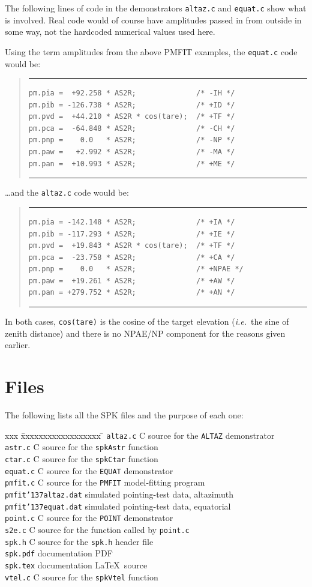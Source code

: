 \documentclass[11pt,fleqn,twoside,\paper]{article}
\renewcommand{\_}{{\tt\char'137}}     %
\newcommand{\scode}     {\goodbreak
                         \begin{quote}
                         \vspace{-6ex}
                         \rule[-2ex]{36em}{0.03ex}}
\newcommand{\ecode}     {\rule[2ex]{36em}{0.03ex}
                         \end{quote}
                         \vspace{-4ex}
                         \goodbreak}
\begin{document}
The following lines of code in
the demonstrators {\tt altaz.c} and {\tt equat.c}
show what is involved.  Real code would of course have
amplitudes passed in from outside in some way, not the
hardcoded numerical values used here.

Using the term amplitudes from the above PMFIT examples,
the {\tt equat.c} code would be:
\scode\begin{verbatim}
pm.pia =  +92.258 * AS2R;              /* -IH */
pm.pib = -126.738 * AS2R;              /* +ID */
pm.pvd =  +44.210 * AS2R * cos(tare);  /* +TF */
pm.pca =  -64.848 * AS2R;              /* -CH */
pm.pnp =    0.0   * AS2R;              /* -NP */
pm.paw =   +2.992 * AS2R;              /* -MA */
pm.pan =  +10.993 * AS2R;              /* +ME */
\end{verbatim}\ecode
\ldots and the {\tt altaz.c} code would be:
\scode\begin{verbatim}
pm.pia = -142.148 * AS2R;              /* +IA */
pm.pib = -117.293 * AS2R;              /* +IE */
pm.pvd =  +19.843 * AS2R * cos(tare);  /* +TF */
pm.pca =  -23.758 * AS2R;              /* +CA */
pm.pnp =    0.0   * AS2R;              /* +NPAE */
pm.paw =  +19.261 * AS2R;              /* +AW */
pm.pan = +279.752 * AS2R;              /* +AN */
\end{verbatim}\ecode
In both cases, {\tt cos(tare)} is the cosine of the
target elevation ({\it i.e.}~the sine of zenith distance)
and there is no NPAE/NP component for the reasons given
earlier.

\newpage

\section{Files}
\label{files}
The following lists all the SPK files and the purpose of each one:
\begin{tabbing}
xxx \= xxxxxxxxxxxxxxxxxx \= \kill
\> {\tt altaz.c} \> C source for the {\tt ALTAZ} demonstrator \\
\> {\tt astr.c} \> C source for the {\tt spkAstr} function \\
\> {\tt ctar.c} \> C source for the {\tt spkCtar} function \\
\> {\tt equat.c} \> C source for the {\tt EQUAT} demonstrator \\
\> {\tt pmfit.c} \> C source for the {\tt PMFIT} model-fitting program \\
\> {\tt pmfit\_altaz.dat} \> simulated pointing-test data, altazimuth \\
\> {\tt pmfit\_equat.dat} \> simulated pointing-test data, equatorial \\
\> {\tt point.c} \> C source for the {\tt POINT} demonstrator \\
\> {\tt s2e.c} \> C source for the function called by {\tt point.c} \\
\> {\tt spk.h} \> C source for the {\tt spk.h} header file \\
\> {\tt spk.pdf} \> documentation PDF \\
\> {\tt spk.tex} \> documentation \LaTeX\ source \\
\> {\tt vtel.c} \> C source for the {\tt spkVtel} function \\
\end{tabbing}
\end{document}
